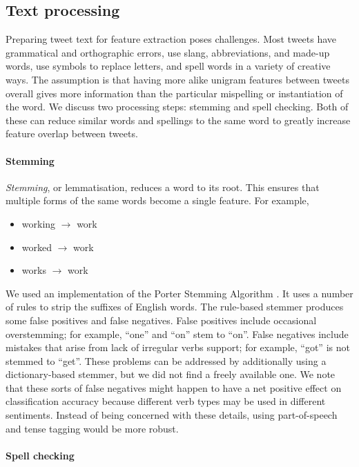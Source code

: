 \subsection{Text processing} 

Preparing tweet text for feature extraction poses challenges. Most tweets have
grammatical and orthographic errors, use slang, abbreviations, and made-up
words, use symbols to replace letters, and spell words in a variety of creative
ways. The assumption is that having more alike unigram features between tweets
overall gives more information than the particular mispelling or instantiation of the
word. We discuss two processing steps: stemming and spell checking. Both of
these can reduce similar words and spellings to the same word to greatly
increase feature overlap between tweets. 


\paragraph{Stemming}

\emph{Stemming}, or lemmatisation, reduces a word to its root. This ensures that multiple forms of the same words become a single feature. For example,
\begin{itemize}
\item working $\rightarrow$ work
\item worked $\rightarrow$ work
\item works $\rightarrow$  work
\end{itemize}

We used an implementation of the Porter Stemming Algorithm \cite{Porter:1980}.
It uses a number of rules to strip the suffixes of English words. The
rule-based stemmer produces some false positives and false negatives. False
positives include occasional overstemming; for example, ``one'' and ``on'' stem
to ``on''. False negatives include mistakes that arise from lack of irregular
verbs support; for example, ``got'' is not stemmed to ``get''. These problems
can be addressed by additionally using a dictionary-based stemmer, but we did
not find a freely available one. We note that these sorts of false
negatives might happen to have a net positive effect on classification
accuracy because different verb types may be used in different
sentiments. Instead of being concerned with these details, using part-of-speech and tense tagging would be more robust.


\paragraph{Spell checking}

